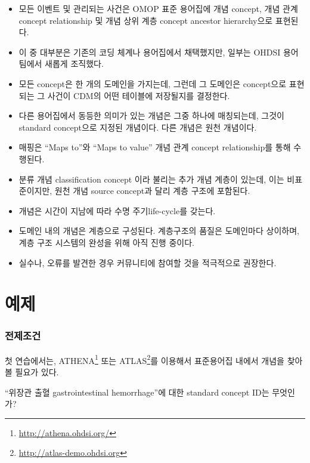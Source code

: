 \documentclass[10.5pt]{book}
\providecommand{\tightlist}{%
  \setlength{\itemsep}{0pt}\setlength{\parskip}{0pt}}
\let\rmarkdownfootnote\footnote%
\def\footnote{\protect\rmarkdownfootnote}
\theoremstyle{definition}
\theoremstyle{definition}
\theoremstyle{definition}
\theoremstyle{remark}
\let\BeginKnitrBlock\begin \let\EndKnitrBlock\end
\begin{document}
\BeginKnitrBlock{rmdsummary}
\begin{itemize}
\tightlist
\item
  모든 이벤트 및 관리되는 사건은 OMOP 표준 용어집에 개념 concept, 개념
  관계 concept relationship 및 개념 상위 계층 concept ancestor
  hierarchy으로 표현된다.
\item
  이 중 대부분은 기존의 코딩 체계나 용어집에서 채택했지만, 일부는 OHDSI
  용어팀에서 새롭게 조직했다.
\item
  모든 concept은 한 개의 도메인을 가지는데, 그런데 그 도메인은
  concept으로 표현되는 그 사건이 CDM의 어떤 테이블에 저장될지를
  결정한다.
\item
  다른 용어집에서 동등한 의미가 있는 개념은 그중 하나에 매칭되는데,
  그것이 standard concept으로 지정된 개념이다. 다른 개념은 원천
  개념이다.
\item
  매핑은 ``Maps to''와 ``Maps to value'' 개념 관계 concept
  relationship를 통해 수행된다.
\item
  분류 개념 classification concept 이라 불리는 추가 개념 계층이 있는데,
  이는 비표준이지만, 원천 개념 source concept과 달리 계층 구조에
  포함된다.
\item
  개념은 시간이 지남에 따라 수명 주기life-cycle를 갖는다.
\item
  도메인 내의 개념은 계층으로 구성된다. 계층구조의 품질은 도메인마다
  상이하며, 계층 구조 시스템의 완성을 위해 아직 진행 중이다.
\item
  실수나, 오류를 발견한 경우 커뮤니티에 참여할 것을 적극적으로 권장한다.
\end{itemize}
\EndKnitrBlock{rmdsummary}

\section{예제}\label{-1}

\subsubsection*{전제조건}

첫 연습에서는, ATHENA\footnote{\url{http://athena.ohdsi.org/}} 또는
ATLAS\footnote{\url{http://atlas-demo.ohdsi.org}}를 이용해서 표준용어집
내에서 개념을 찾아볼 필요가 있다.

\BeginKnitrBlock{exercise}
\protect\hypertarget{exr:exerciseVocab1}{}{\label{exr:exerciseVocab1}
}``위장관 출혈 gastrointestinal hemorrhage''에 대한 standard concept
ID는 무엇인가?
\EndKnitrBlock{exercise}
\end{document}
